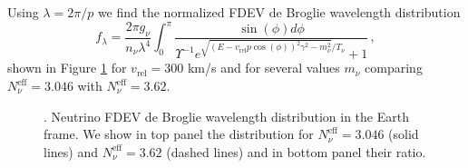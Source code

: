 Using $\lambda=2\pi/p$ we find  the normalized FDEV de Broglie wavelength distribution
\begin{equation}
f_\lambda=\frac{ 2\pi g_\nu}{n_\nu\lambda^4}\!\!\int_0^\pi\!\!\! \!\frac{\sin(\phi) d\phi}{\Upsilon^{-1}e^{\sqrt{( E-v_{\text{rel}} p \cos(\phi))^2\gamma^2-m_\nu^2}/T_\nu}\!\!+\!1}\,,
\end{equation}
shown in Figure \ref{fig:deBrogle_300} for $v_{\text{rel}}=300$ km/s and for several values $m_\nu$ comparing  $N_\nu^{\mathrm{eff}}=3.046$ with $N_\nu^{\mathrm{eff}}=3.62$. %
\begin{figure}%
\begin{minipage}{\linewidth}
\end{minipage}
\caption{.  Neutrino  FDEV de Broglie wavelength  distribution in the Earth frame. We show in top panel the distribution for $N_\nu^{\mathrm{eff}}=3.046$ (solid lines) and $N_\nu^{\mathrm{eff}}=3.62$ (dashed lines) and in bottom panel their ratio.}\label{fig:deBrogle_300}
 \end{figure}


